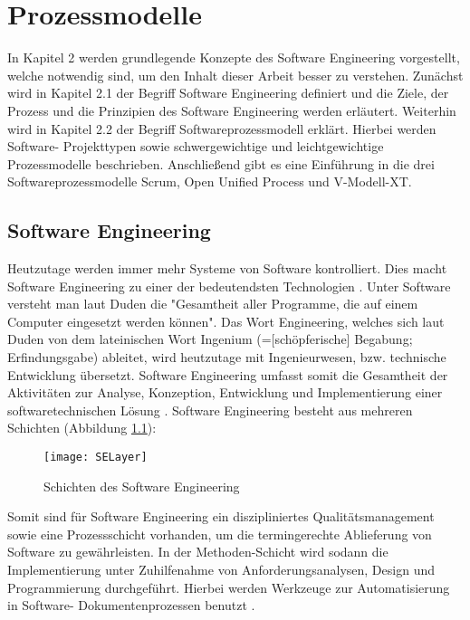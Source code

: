 \chapter{Prozessmodelle}\label{sec:chapter2}

In Kapitel 2 werden grundlegende Konzepte des Software Engineering vorgestellt, welche notwendig sind, um den Inhalt dieser Arbeit besser zu verstehen. Zunächst wird in Kapitel 2.1 der Begriff Software Engineering definiert und die Ziele, der Prozess und die Prinzipien des Software Engineering werden erläutert. Weiterhin wird in Kapitel 2.2 der Begriff Softwareprozessmodell erklärt. Hierbei werden Software- Projekttypen sowie schwergewichtige und leichtgewichtige Prozessmodelle beschrieben. Anschließend gibt es eine Einführung in die drei Softwareprozessmodelle Scrum, Open Unified Process und V-Modell-XT.

\section{Software Engineering}\label{sec:chapter2: Software Engineering}
Heutzutage werden immer mehr Systeme von Software kontrolliert. Dies macht Software Engineering zu einer der bedeutendsten Technologien \cite{Puntambekar2007}.
Unter Software versteht man laut Duden die "Gesamtheit aller Programme, die auf einem Computer eingesetzt werden können". Das Wort Engineering, welches sich laut Duden von dem lateinischen Wort Ingenium (=[schöpferische] Begabung; Erfindungsgabe) ableitet, wird heutzutage mit Ingenieurwesen, bzw. technische Entwicklung übersetzt. Software Engineering umfasst somit die Gesamtheit der Aktivitäten zur Analyse, Konzeption, Entwicklung und Implementierung einer softwaretechnischen Lösung \cite{Specker1998}.
Software Engineering besteht aus mehreren Schichten (Abbildung \ref{fig:SchichtenSE}):

\begin{figure}[htp]
\begin{center}
  \texttt{[image: SELayer]} %
  \caption{Schichten des Software Engineering \cite{Puntambekar2007}}
  \label{fig:SchichtenSE}
\end{center}
\end{figure}

Somit sind für Software Engineering ein diszipliniertes Qualitätsmanagement sowie eine Prozessschicht vorhanden, um die termingerechte Ablieferung von Software zu gewährleisten. In der Methoden-Schicht wird sodann die Implementierung unter Zuhilfenahme von Anforderungsanalysen, Design und Programmierung durchgeführt. Hierbei werden Werkzeuge zur Automatisierung in Software- Dokumentenprozessen benutzt \cite{Puntambekar2007}. 

